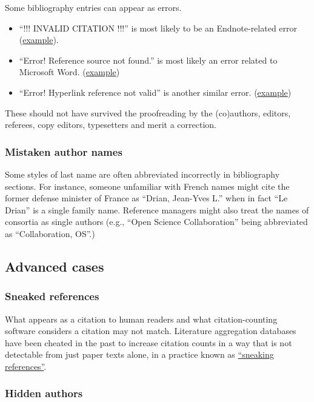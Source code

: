 \documentclass[letterpaper, 12pt]{article}
\begin{document}
Some bibliography entries can appear as errors. 
\begin{itemize}

    \item ``!!! INVALID CITATION !!!'' is most likely to be an Endnote-related error (\href{https://pubpeer.com/publications/87320DD76ED35F5F3023F890C15023}{example}).  
    \item ``Error! Reference source not found.'' is most likely an error related to Microsoft Word. (\href{https://pubpeer.com/publications/1BE25CD291387136DA3474C7D97287}{example})
    \item ``Error! Hyperlink reference not valid'' is another similar error. (\href{https://pubpeer.com/publications/88516C0A7BFF973A515FD3EA842022}{example}) 
\end{itemize}
These should not have survived the proofreading by the (co)authors, editors, referees, copy editors, 
typesetters and merit a correction.

\subsubsection*{Mistaken author names}

Some styles of last name are often abbreviated incorrectly in bibliography sections.
For instance, someone unfamiliar with French names might cite the former defense minister of France as ``Drian, Jean-Yves L.''
when in fact ``Le Drian'' is a single family name. Reference managers might also treat the names of consortia as single authors (e.g., ``Open Science Collaboration'' being abbreviated as ``Collaboration, OS''.)

\subsection*{Advanced cases}

\subsubsection*{Sneaked references}

What appears as a citation to human readers and what citation-counting software considers a citation may not match.
Literature aggregation databases have been cheated in the past to increase citation counts in a way that is not detectable from just paper texts alone, in a practice known as \href{https://doi.org/10.1002/asi.24896}{``sneaking references''}.

\subsubsection*{Hidden authors}
\end{document}
